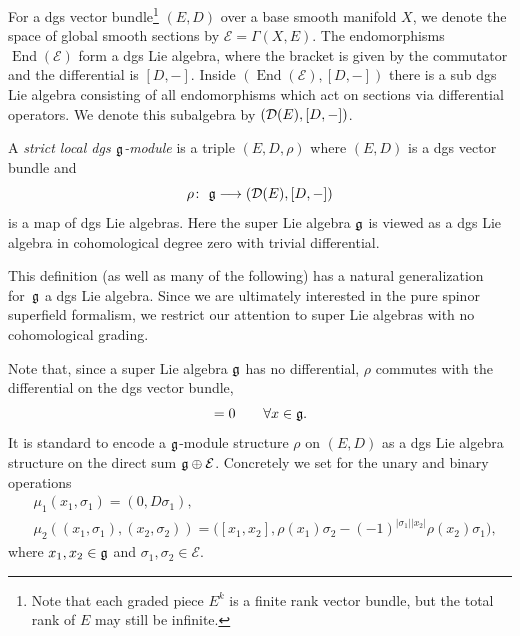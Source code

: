\documentclass[11pt]{article}
\numberwithin{equation}{section}
\numberwithin{equation}{section}
\def\cE{\mathcal E}\def\cF{\mathcal F}\def\cG{\mathcal G}\def\cH{\mathcal H}
\DeclareMathOperator{\End}{End}
\begin{document}
For a dgs vector bundle\footnote{Note that each graded piece $E^k$ is a finite rank vector bundle, but the total rank of $E$ may still be infinite.} $(E,D)$ over a base smooth manifold $X$, we denote the space of global smooth sections by $\cE = \Gamma(X,E)$. The endomorphisms $\End(\cE)$ form a dgs Lie algebra, where the bracket is given by the commutator and the differential is $[D,-]$. Inside $(\End(\cE), [D,-])$ there is a sub dgs Lie algebra consisting of all endomorphisms which act on sections via differential operators. We denote this subalgebra by $(\mathcal D(E), [D,-])$.
\begin{dfn}
	A \emph{strict local dgs $\mathfrak g$-module} is a triple $(E,D,\rho)$ where $(E,D)$ is a dgs vector bundle and
	\begin{equation*}
	\rho \colon \ \fg \longrightarrow (\cD(E) , [D,-] )
	\end{equation*}
	is a map of dgs Lie algebras. Here the super Lie algebra $\mathfrak g$ is viewed as a dgs Lie algebra in cohomological degree zero with trivial differential.
\end{dfn}
\begin{rmk}
	This definition (as well as many of the following) has a natural generalization for~$\mathfrak g$ a dgs Lie algebra. Since we are ultimately interested in the pure spinor superfield formalism, we restrict our attention to super Lie algebras with no cohomological grading.
\end{rmk}
Note that, since a super Lie algebra $\mathfrak g$ has no differential, $\rho$ commutes with the differential on the dgs vector bundle,
\begin{equation*}
[D,\rho(x)] = 0 \qquad \forall x \in \fg .
\end{equation*}
It is standard to encode a $\mathfrak g$-module structure $\rho$ on $(E,D)$ as a dgs Lie algebra structure on the direct sum $\fg \oplus \cE$. Concretely we set for the unary and binary operations
\begin{align}
&\mu_1(x_1,\sigma_1) = (0, D\sigma_1),\nonumber \\
&\mu_2((x_1,\sigma_1),(x_2,\sigma_2)) = \big([x_1,x_2] , \rho(x_1)\sigma_2 - (-1)^{|\sigma_1| |x_2|} \rho(x_2)\sigma_1 \big) ,\label{eq: lie structure on sum}
\end{align}
where $x_1,x_2 \in \mathfrak g$ and $\sigma_1,\sigma_2 \in \cE$.
\end{document}
